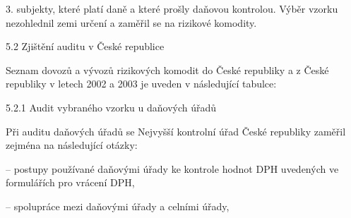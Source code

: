 \documentclass[10pt]{article}
\begin{document}
3. subjekty, které platí daně a které prošly daňovou kontrolou.
Výběr vzorku nezohlednil zemi určení a zaměřil se na rizikové komodity.


5.2 Zjištění auditu v České republice



Seznam dovozů a vývozů rizikových komodit do České republiky a z České republiky v letech 2002 a 2003 je uveden v následující tabulce:



5.2.1 Audit vybraného vzorku u daňových úřadů



Při auditu daňových úřadů se Nejvyšší kontrolní úřad České republiky zaměřil zejména na následující otázky:



– postupy používané daňovými úřady ke kontrole hodnot DPH uvedených ve formulářích pro vrácení DPH,



– spolupráce mezi daňovými úřady a celními úřady,
\end{document}
